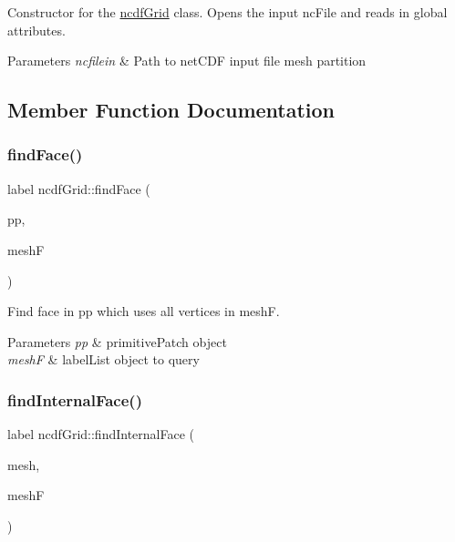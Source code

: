 Constructor for the \mbox{\hyperlink{classncdfGrid}{ncdf\+Grid}} class. Opens the input nc\+File and reads in global attributes. 


\begin{DoxyParams}{Parameters}
{\em ncfilein} & Path to net\+C\+DF input file mesh partition \\
\hline
\end{DoxyParams}


\subsection{Member Function Documentation}
\mbox{\label{classncdfGrid_a4f0353f650720f518189b4adfa7d3b10}} 
\subsubsection{\texorpdfstring{find\+Face()}{findFace()}}
{\footnotesize\ttfamily label ncdf\+Grid\+::find\+Face (\begin{DoxyParamCaption}\item[{const primitive\+Patch \&}]{pp,  }\item[{const label\+List \&}]{meshF }\end{DoxyParamCaption})\hspace{0.3cm}{\ttfamily [inline]}}



Find face in pp which uses all vertices in meshF. 


\begin{DoxyParams}{Parameters}
{\em pp} & primitive\+Patch object \\
\hline
{\em meshF} & label\+List object to query \\
\hline
\end{DoxyParams}
\mbox{\label{classncdfGrid_a1ce028e8c7c31e35b386ab99f993a33d}} 
\subsubsection{\texorpdfstring{find\+Internal\+Face()}{findInternalFace()}}
{\footnotesize\ttfamily label ncdf\+Grid\+::find\+Internal\+Face (\begin{DoxyParamCaption}\item[{const primitive\+Mesh \&}]{mesh,  }\item[{const label\+List \&}]{meshF }\end{DoxyParamCaption})\hspace{0.3cm}{\ttfamily [inline]}}



